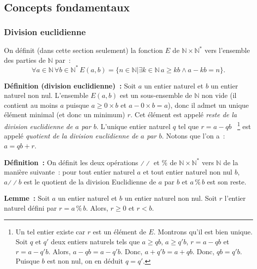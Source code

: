\subsection{Concepts fondamentaux}

\subsubsection{Division euclidienne}
\label{subsec:divEuclidienne}

On définit (dans cette section seulement) la fonction $E$ de $\mathbb{N} \times \mathbb{N}^*$ vers l'ensemble des parties de $\mathbb{N}$ par : 
\begin{equation*}
    \forall a \in \mathbb{N} \, 
    \forall b \in \mathbb{N}^* \, 
    E(a,b) = \lbrace
        n \in \mathbb{N} 
        \vert
        \exists k \in \mathbb{N} \,  
        a \geq k b \wedge a - k b = n
    \rbrace .
\end{equation*}

\medskip

\noindent\textbf{Définition (division euclidienne) :}
Soit $a$ un entier naturel et $b$ un entier naturel non nul.
L'ensemble $E(a,b)$ est un sous-ensemble de $\mathbb{N}$ non vide (il contient au moins $a$ puisque $a \geq 0 \times b$ et $a - 0 \times b = a$), donc il admet un unique élément minimal (et donc un minimum) $r$. 
Cet élément est appelé \textit{reste de la division euclidienne de $a$ par $b$}. 
L'unique entier naturel $q$ tel que $r = a - q b$%
~\footnote{Un tel entier existe car $r$ est un élément de $E$. 
    Montrons qu'il est bien unique. 
    Soit $q$ et $q'$ deux entiers naturels tels que $a \geq q b$, $a \geq q' b$, $r = a - q b$ et $r = a - q' b$.
    Alors, $a - q b = a - q' b$.
    Donc, $a + q' b = a + q b$.
    Donc, $q b = q' b$.
    Puisque $b$ est non nul, on en déduit $q = q'$.
}  
est appelé \textit{quotient de la division euclidienne de $a$ par $b$}. 
Notons que l'on a : $a = q b + r$. 

\medskip

\noindent\textbf{Définition :} On définit les deux opérations $\divslash\!\divslash$ et $\%$ de $\mathbb{N} \times \mathbb{N}^*$ vers $\mathbb{N}$ de la manière suivante : pour tout entier naturel $a$ et tout entier naturel non nul $b$, $a \mathrel{\divslash\!\divslash} b$ est le quotient de la division Euclidienne de $a$ par $b$ et $a \mathrel{\%} b$ est son reste. 

\medskip

\noindent\textbf{Lemme :} Soit $a$ un entier naturel et $b$ un entier naturel non nul.
    Soit $r$ l'entier naturel défini par $r = a \mathrel{\%} b$.
    Alors, $r \geq 0$ et $r < b$.

